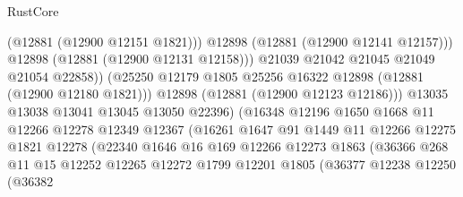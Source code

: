 \begin{lexlean}{RustCore}
\begin{coremodule}
                                        (@12881 (@12900 @12151 @1821)))
                                      @12898
                                      (@12881 (@12900 @12141 @12157)))
                                    @12898
                                    (@12881 (@12900 @12131 @12158)))
                                  @21039
                                  @21042
                                  @21045
                                  @21049
                                  @21054
                                  @22858))
                              (@25250
                                @12179
                                @1805
                                @25256
                                @16322
                                @12898
                                (@12881 (@12900 @12180 @1821)))
                              @12898
                              (@12881 (@12900 @12123 @12186)))
                            @13035
                            @13038
                            @13041
                            @13045
                            @13050
                            @22396)
                          (@16348
                            @12196
                            @1650
                            @1668
                            @11
                            @12266
                            @12278
                            @12349
                            @12367
                            (@16261
                              @1647
                              @91
                              @1449
                              @11
                              @12266
                              @12275
                              @1821
                              @12278
                              (@22340
                                @1646
                                @16
                                @169
                                @12266
                                @12273
                                @1863
                                (@36366
                                  @268
                                  @11
                                  @15
                                  @12252
                                  @12265
                                  @12272
                                  @1799
                                  @12201
                                  @1805
                                  (@36377
                                    @12238
                                    @12250
                                    (@36382

\end{coremodule}
\end{lexlean}
